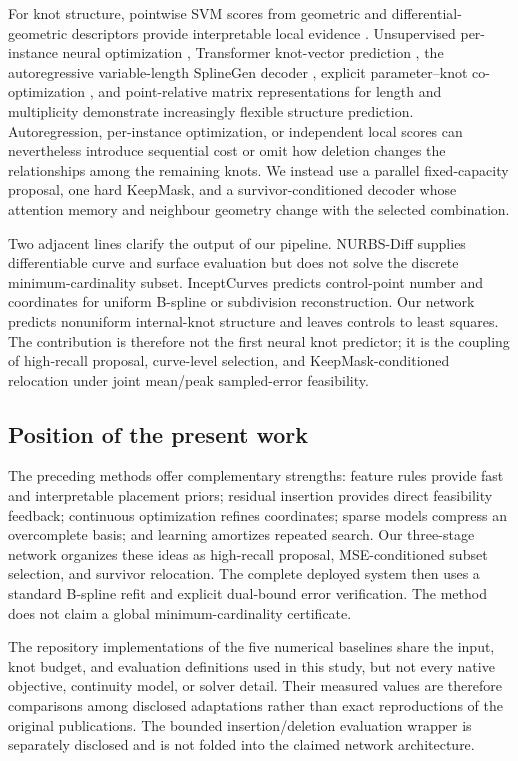 \documentclass[preprint,12pt]{elsarticle}
\begin{document}
For knot structure, pointwise SVM scores from geometric and
differential-geometric descriptors provide interpretable local evidence
\cite{laube2018svm}. Unsupervised per-instance neural optimization
\cite{wen2024}, Transformer knot-vector prediction \cite{saillot2024}, the
autoregressive variable-length SplineGen decoder \cite{zou2025}, explicit
parameter--knot co-optimization \cite{tang2026}, and point-relative matrix
representations for length and multiplicity \cite{saillot2026} demonstrate
increasingly flexible structure prediction. Autoregression, per-instance
optimization, or independent local scores can nevertheless introduce
sequential cost or omit how deletion changes the relationships among the
remaining knots. We instead use a parallel fixed-capacity proposal, one hard
KeepMask, and a survivor-conditioned decoder whose attention memory and
neighbour geometry change with the selected combination.

Two adjacent lines clarify the output of our pipeline. NURBS-Diff
\cite{prasad2022} supplies differentiable curve and surface evaluation but
does not solve the discrete minimum-cardinality subset. InceptCurves
\cite{barzegar2024} predicts control-point number and coordinates for uniform
B-spline or subdivision reconstruction. Our network predicts nonuniform
internal-knot structure and leaves controls to least squares. The contribution
is therefore not the first neural knot predictor; it is the coupling of
high-recall proposal, curve-level selection, and KeepMask-conditioned
relocation under joint mean/peak sampled-error feasibility.

\subsection{Position of the present work}
The preceding methods offer complementary strengths: feature rules provide
fast and interpretable placement priors; residual insertion provides direct
feasibility feedback; continuous optimization refines coordinates; sparse
models compress an overcomplete basis; and learning amortizes repeated search.
Our three-stage network organizes these ideas as high-recall proposal,
MSE-conditioned subset selection, and survivor relocation. The complete
deployed system then uses a standard B-spline refit and explicit dual-bound
error verification.
The method does not claim a global minimum-cardinality certificate.

The repository implementations of the five numerical baselines share the
input, knot budget, and evaluation definitions used in this study, but not
every native objective, continuity model, or solver detail. Their measured
values are therefore comparisons among disclosed adaptations rather than exact
reproductions of the original publications. The bounded insertion/deletion
evaluation wrapper is separately disclosed and is not folded into the claimed
network architecture.
\end{document}
